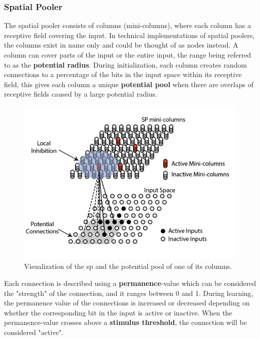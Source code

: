 \subsubsection{Spatial Pooler}
\label{sec:spatial_pooler}
The spatial pooler consists of columns (mini-columns), where each column has a receptive field covering the input. In technical implementations of spatial poolers, the columns exist in name only and could be thought of as nodes instead. A column can cover parts of the input or the entire input, the range being referred to as the \textbf{potential radius}. During initialization, each column creates random connections to a percentage of the bits in the input space within its receptive field, this gives each column a unique \textbf{potential pool} when there are overlaps of receptive fields caused by a large potential radius.\par
\begin{figure}[H]
    \centering
    \includegraphics[width=\linewidth]{resources/related_works/sp_vis_alt}
    \caption{Visualization of the \gls*{sp} and the potential pool of one of its columns.}
\end{figure}
Each connection is described using a \textbf{permanence}-value which can be considered the "strength" of the connection, and it ranges between 0 and 1. During learning, the permanence value of the connections is increased or decreased depending on whether the corresponding bit in the input is active or inactive. When the permanence-value crosses above a \textbf{stimulus threshold}, the connection will be considered "active".

